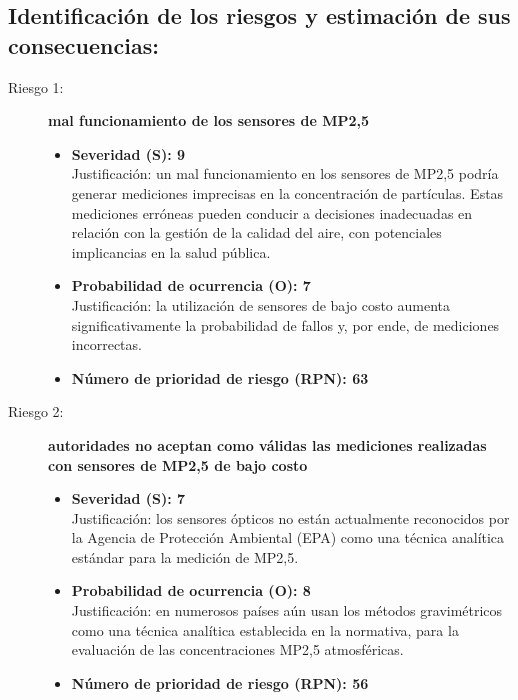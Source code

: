 \subsection{ Identificación de los riesgos y estimación de sus consecuencias:}
\begin{description}
	
	\item[Riesgo 1:]\textbf{mal funcionamiento de los sensores de MP2,5}
	\begin{itemize}
		\item \textbf{Severidad (S): 9} \\
		Justificación: un mal funcionamiento en los sensores de MP2,5 podría generar mediciones imprecisas en la concentración de partículas. Estas mediciones erróneas pueden conducir a decisiones inadecuadas en relación con la gestión de la calidad del aire, con potenciales implicancias en la salud pública.
		
		\item \textbf{Probabilidad de ocurrencia (O): 7} \\
		Justificación: la utilización de sensores de bajo costo aumenta significativamente la probabilidad de fallos y, por ende, de mediciones incorrectas.
		\item \textbf{Número de prioridad de riesgo (RPN): 63} \\
	\end{itemize}
	
	
	\item[Riesgo 2:] \textbf{autoridades no aceptan como válidas las mediciones realizadas con sensores de MP2,5 de bajo costo}  	 
	\begin{itemize}
		\item \textbf{Severidad (S): 7}\\
		Justificación: los sensores ópticos no están actualmente reconocidos por la Agencia de Protección Ambiental (EPA) como una técnica analítica estándar para la medición de MP2,5.
		
		\item \textbf{Probabilidad de ocurrencia (O): 8} \\
		Justificación: en numerosos países aún usan los métodos gravimétricos como una técnica analítica establecida en la normativa, para la evaluación de las concentraciones MP2,5 atmosféricas.
		\item \textbf{Número de prioridad de riesgo (RPN): 56} \\
	\end{itemize}  
	

\end{description}
